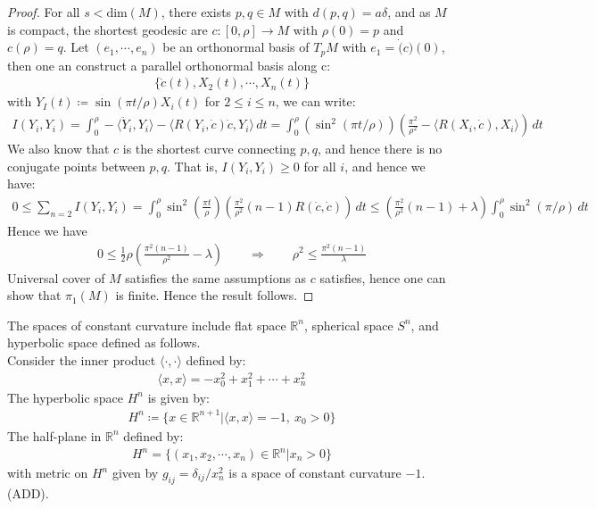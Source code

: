\documentclass[11pt]{book}
\theoremstyle{break}
\theoremstyle{break}
\newcommand{\R}{\mathbb{R}}
\begin{document}
\begin{proof}
For all $s < \text{dim}(M)$, there exists $p,q \in M$ with $d(p,q) = a \delta$, and as $M$ is compact, the shortest geodesic are $c:[0,\rho] \to M$ with $\rho(0) = p$ and $c(\rho) = q$. Let $(e_1,\cdots,e_n)$ be an orthonormal basis of $T_pM$ with $e_1 = \dot(c)(0)$, then one an construct a parallel orthonormal basis along c:
\begin{align*}
\{\dot{c}(t), X_2(t) ,\cdots, X_n(t) \}
\end{align*}
with $Y_I(t) \coloneqq \sin(\pi t/\rho)X_i(t)$ for $2 \leq i \leq n$, we can write:
\begin{align*}
I(Y_i, Y_i)  = \int_0^\rho -\langle \ddot{Y}_i, Y_i \rangle - \langle R(Y_i, \dot{c})\dot{c}, Y_i \rangle  \, dt = \int_0^\rho \left( \sin^2(\pi t/\rho ) \right) \left( \frac{\pi^2}{\rho^2} - \langle R(X_i,\dot{c}), X_i\rangle \right) \, dt
\end{align*}  
We also know that $c$ is the shortest curve connecting $p,q$, and hence there is no conjugate points between $p,q$. That is, $I(Y_i, Y_i) \geq 0$ for all $i$, and hence we have:
\begin{align*}
0 \leq \sum_{n=2}I(Y_i, Y_{i}) = \int_0^\rho \sin^2\left( \frac{\pi t}{\rho}\right) \left( \frac{\pi^2}{\rho^2}(n-1) R(\dot{c},\dot{c})\right) 
\, dt
\leq \left( \frac{\pi^2}{\rho^2}(n-1) + \lambda \right) \int_0^\rho \sin^2(\pi /\rho)\, dt
\end{align*}
Hence we have
\begin{align*}
0 \leq \frac{1}{2}\rho \left( \frac{\pi^2(n-1)}{\rho^2}-\lambda\right) \qquad \Rightarrow \qquad \rho^2 \leq \frac{\pi^2 ( n-1)}{\lambda}
\end{align*}
Universal cover of $M$ satisfies the same assumptions as $c$ satisfies, hence one can show that $\pi_1(M)$ is finite. Hence the result follows.
\end{proof}

The spaces of constant curvature include flat space $\R^n$, spherical space $S^n$, and hyperbolic space defined as follows. \\

Consider the inner product $\langle \cdot, \cdot \rangle$ defined by:
\begin{align*}
\langle x,x\rangle = -x_0^2 + x_1^2 + \cdots + x_n^2
\end{align*}
The hyperbolic space $H^n$ is given by:
\begin{align*}
H^n \coloneqq \{ x \in \R^{n+1} | \langle x, x\rangle = -1,\ x_0>0\}
\end{align*}
The half-plane in $\R^n$ defined by:
\begin{align*}
H^n = \{ (x_1,x_2,\cdots,x_n) \in \R^n | x_n > 0 \}
\end{align*}
with metric on $H^n$ given by $g_{ij} = \delta_{ij}/ x_n^2$ is a space of constant curvature $-1$. (ADD).\\
\end{document}

